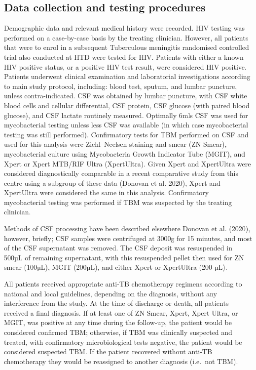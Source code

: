 \documentclass[
]{article}
\begin{document}
\hypertarget{data-collection-and-testing-procedures}{%
\subsection{Data collection and testing procedures}\label{data-collection-and-testing-procedures}}

Demographic data and relevant medical history were recorded. HIV testing was performed on a case-by-case basis by the treating clinician. However, all patients that were to enrol in a subsequent Tuberculous meningitis randomised controlled trial also conducted at HTD were tested for HIV. Patients with either a known HIV positive status, or a positive HIV test result, were considered HIV positive. Patients underwent clinical examination and laboratorial investigations according to main study protocol, including: blood test, sputum, and lumbar puncture, unless contra-indicated. CSF was obtained by lumbar puncture, with CSF white blood cells and cellular differential, CSF protein, CSF glucose (with paired blood glucose), and CSF lactate routinely measured. Optimally 6mls CSF was used for mycobacterial testing unless less CSF was available (in which case mycobacterial testing was still performed). Confirmatory tests for TBM performed on CSF and used for this analysis were Ziehl--Neelsen staining and smear (ZN Smear), mycobacterial culture using Mycobacteria Growth Indicator Tube (MGIT), and Xpert or Xpert MTB/RIF Ultra (XpertUltra). Given Xpert and XpertUltra were considered diagnostically comparable in a recent comparative study from this centre using a subgroup of these data (Donovan et al. 2020), Xpert and XpertUltra were considered the same in this analysis. Confirmatory mycobacterial testing was performed if TBM was suspected by the treating clinician.

Methods of CSF processing have been described elsewhere Donovan et al. (2020), however, briefly; CSF samples were centrifuged at 3000g for 15 minutes, and most of the CSF supernatant was removed. The CSF deposit was resuspended in 500µL of remaining supernatant, with this resuspended pellet then used for ZN smear (100µL), MGIT (200µL), and either Xpert or XpertUltra (200 µL).

All patients received appropriate anti-TB chemotherapy regimens according to national and local guidelines, depending on the diagnosis, without any interference from the study. At the time of discharge or death, all patients received a final diagnosis. If at least one of ZN Smear, Xpert, Xpert Ultra, or MGIT, was positive at any time during the follow-up, the patient would be considered confirmed TBM; otherwise, if TBM was clinically suspected and treated, with confirmatory microbiological tests negative, the patient would be considered suspected TBM. If the patient recovered without anti-TB chemotherapy they would be reassigned to another diagnosis (i.e.~not TBM).
\end{document}
